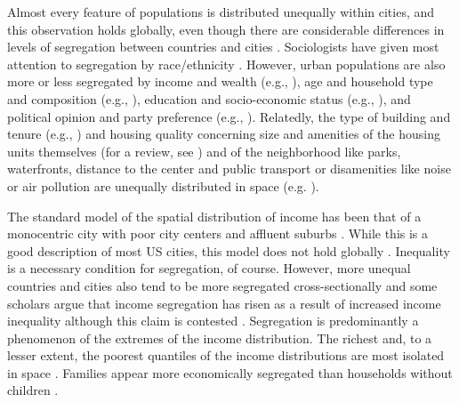 Almost every feature of populations is distributed unequally within cities, and this observation holds globally, even though there are considerable differences in levels of segregation between countries and cities \citep{quillianSocioeconomicSegregationLarge2016, oecdDividedCitiesUnderstanding2018, vanhamUrbanSocioEconomicSegregation2021}. Sociologists have given most attention to segregation by race/ethnicity \citep{charlesDynamicsRacialResidential2003}. However, urban populations are also more or less segregated by income and wealth (e.g., \cite{reardonIncomeInequalityIncome2011, oecdDividedCitiesUnderstanding2018, helbigHinterFassadenZur2023}), age and household type and composition (e.g., \cite{owensInequalityChildrenContexts2016, loganBirdsFeatherSocial2016, mutganIncomeInequalityResidential2023}), education and socio-economic status (e.g., \cite{quillianSocioeconomicSegregationLarge2016, helbigHinterFassadenZur2023}), and political opinion and party preference (e.g., \cite{mummoloWhyPartisansNot2017}). 
Relatedly, the type of building and tenure (e.g., \cite{loufPatternsResidentialSegregation2016, oecdDividedCitiesUnderstanding2018, owensBuildingInequalityHousing2019, beaubrun-diantImpactPublicHousing2022}) and housing quality concerning size and amenities of the housing units themselves (for a review, see \cite{chauCriticalReviewLiterature2003}) and of the neighborhood like parks, waterfronts, distance to the center and public transport or disamenities like noise or air pollution are unequally distributed in space (e.g. \cite{leeNaturalAmenitiesNeighbourhood2018, heblichEastSideStoryHistorical2021, ruttenauerEnvironmentalInequalityResidential2021}).

The standard model of the spatial distribution of income has been that of a monocentric city with poor city centers and affluent suburbs \citep{bruecknerLecturesUrbanEconomics2011, rosenthalChangePersistenceEconomic2015}. While this is a good description of most US cities, this model does not hold globally \citep{bruecknerWhyCentralParis1999, quillianSocioeconomicSegregationLarge2016, gaigneWhoLivesWhere2022}. Inequality is a necessary condition for segregation, of course. However, more unequal countries and cities also tend to be more segregated cross-sectionally \citep{quillianSocioeconomicSegregationLarge2016, oecdDividedCitiesUnderstanding2018, vanhamUrbanSocioEconomicSegregation2021} and some scholars argue that income segregation has risen as a result of increased income inequality \citep{reardonIncomeInequalityIncome2011, vanhamUrbanSocioEconomicSegregation2021, mutganIncomeInequalityResidential2023} although this claim is contested \citep{loganUptickIncomeSegregation2018, loganIncomeSegregationWhom2020, molinderLongrunEvidenceStockholm2026}. Segregation is predominantly a phenomenon of the extremes of the income distribution. The richest and, to a lesser extent, the poorest quantiles of the income distributions are most isolated in space \citep{reardonIncomeInequalityIncome2011, quillianSocioeconomicSegregationLarge2016, oecdDividedCitiesUnderstanding2018, mutganIncomeInequalityResidential2023}. Families appear more economically segregated than households without children \citep{owensInequalityChildrenContexts2016, mutganIncomeInequalityResidential2023}.


